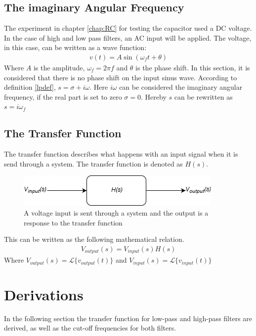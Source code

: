 \subsection{The imaginary Angular Frequency}
The experiment in chapter \ref{chap:RC} for testing the capacitor used a DC voltage. In the case of high and low pass filters, an AC input will be applied. The voltage, in this case, can be written as a wave function:
\begin{align}
v(t)=A\sin(\omega_f t+\theta)
\end{align}
Where $A$ is the amplitude, $\omega_f=2\pi f$ and $\theta$ is the phase shift. In this section, it is considered that there is no phase shift on the input sinus wave. According to definition \ref{lpdef}, $s=\sigma + i \omega$. Here $i \omega$ can be considered the imaginary angular frequency, if the real part is set to zero $\sigma = 0$. Hereby $s$ can be rewritten as $s = i \omega_f$ \cite[p. 733 - 735]{bcircuit9}

\subsection{The Transfer Function}
The transfer function describes what happens with an input signal when it is send through a system. The transfer function is denoted as $H(s)$.
\\
\begin{figure}[H]
\center
\includegraphics[scale=0.6]{fig/img/transfer_function.png}
\caption{A voltage input is sent through a system and the output is a response to the transfer function}
\label{fig:transfer}
\end{figure}
\noindent
This can be written as the following mathematical relation.
\begin{align}
V_{output}(s)=V_{input}(s)H(s)
\end{align}
Where $V_{output}(s)=\mathcal{L}\{v_{output}(t)\}$ and $V_{input}(s)=\mathcal{L}\{v_{input}(t)\}$

\section{Derivations} \label{Derivations}
In the following section the transfer function for low-pass and high-pass filters are derived, as well as the cut-off frequencies for both filters.


